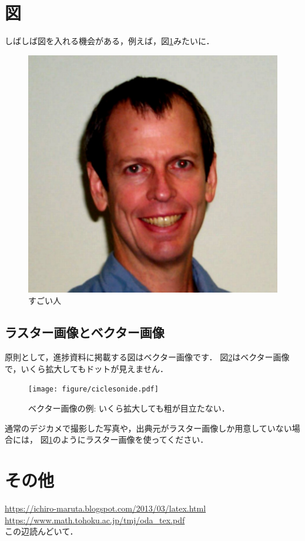 \section{図}
  しばしば図を入れる機会がある，例えば，図\ref{pht_doyle}みたいに．
    \begin{figure}[tbp]
      \centering
      \includegraphics[width = 0.95\columnwidth]{figure/doyle_photo.jpg}
      \caption{すごい人} \label{pht_doyle}
    \end{figure}
  \subsection{ラスター画像とベクター画像}
    原則として，進捗資料に掲載する図はベクター画像です．
    図\ref{fig_ciclesonide}はベクター画像で，いくら拡大してもドットが見えません．
      \begin{figure}[tbp]
        \centering
        \texttt{[image: figure/ciclesonide.pdf]}
        \caption{ベクター画像の例: いくら拡大しても粗が目立たない．} \label{fig_ciclesonide}
      \end{figure}
    通常のデジカメで撮影した写真や，出典元がラスター画像しか用意していない場合には，
    図\ref{pht_doyle}のようにラスター画像を使ってください．

\section{その他}
  \url{https://ichiro-maruta.blogspot.com/2013/03/latex.html} \\
  \url{https://www.math.tohoku.ac.jp/tmj/oda_tex.pdf}\\
  この辺読んどいて．


